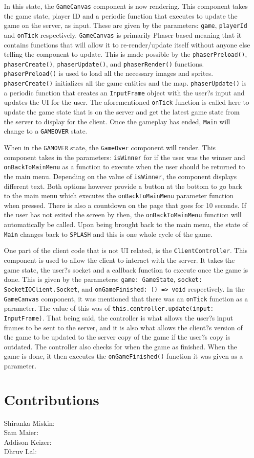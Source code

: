 \documentclass[12pt]{report}
\begin{document}
In this state, the \texttt{GameCanvas} component is now rendering. This component takes the game state, player ID and a periodic function that executes to update the game on the server, as input. These are given by the parameters: \texttt{game}, \texttt{playerId} and \texttt{onTick} respectively. \texttt{GameCanvas} is primarily Phaser based meaning that it contains functions that will allow it to re-render/update itself without anyone else telling the component to update. This is made possible by the \texttt{phaserPreload()}, \texttt{phaserCreate()}, \texttt{phaserUpdate()}, and \texttt{phaserRender()} functions. \texttt{phaserPreload()} is used to load all the necessary images and sprites. \texttt{phaserCreate()} initializes all the game entities and the map. \texttt{phaserUpdate()} is a periodic function that creates an \texttt{InputFrame} object with the user?s input and updates the UI for the user. The aforementioned \texttt{onTick} function is called here to update the game state that is on the server and get the latest game state from the server to display for the client. Once the gameplay has ended, \texttt{Main} will change to a \texttt{GAMEOVER} state.


When in the \texttt{GAMOVER} state, the \texttt{GameOver} component will render. This component takes in the parameters: \texttt{isWinner} for if the user was the winner and \texttt{onBackToMainMenu} as a function to execute when the user should be returned to the main menu. Depending on the value of \texttt{isWinner}, the component displays different text. Both options however provide a button at the bottom to go back to the main menu which executes the \texttt{onBackToMainMenu} parameter function when pressed. There is also a countdown on the page that goes for 10 seconds. If the user has not exited the screen by then, the \texttt{onBackToMainMenu} function will automatically be called. Upon being brought back to the main menu, the state of \texttt{Main} changes back to \texttt{SPLASH} and this is one whole cycle of the game.


One part of the client code that is not UI related, is the \texttt{ClientController}. This component is used to allow the client to interact with the server. It takes the game state, the user?s socket and a callback function to execute once the game is done. This is given by the parameters: \texttt{game: GameState}, \texttt{socket: SocketIOClient.Socket}, and \texttt{onGameFinished: () => void} respectively. In the \texttt{GameCanvas} component, it was mentioned that there was an \texttt{onTick} function as a parameter. The value of this was of \texttt{this.controller.update(input: InputFrame)}. That being said, the controller is what allows the user?s input frames to be sent to the server, and it is also what allows the client?s version of the game to be updated to the server copy of the game if the user?s copy is outdated. The controller also checks for when the game as finished. When the game is done, it then executes the \texttt{onGameFinished()} function it was given as a parameter.

\chapter{Contributions}

Shiranka Miskin: \\
Sam Maier: \\
Addison Keizer: \\
Dhruv Lal: \\
\end{document}
